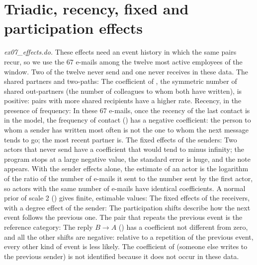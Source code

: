 \section{Triadic, recency, fixed and participation effects}\label{sec:ex-more}

\emph{ex07\_effects.do.} These effects need an event history in which the same pairs recur, so we use the 67 e-mails among the twelve most active employees of the window. Two of the twelve never send and one never receives in these data.
The shared partners and two-paths:
The coefficient of , the symmetric number of shared out-partners (the number of colleagues to whom both have written), is positive: pairs with more shared recipients have a higher rate. Recency, in the presence of frequency:
In these 67 e-mails, once the recency of the last contact is in the model, the frequency of contact () has a negative coefficient: the person to whom a sender has written most often is not the one to whom the next message tends to go; the most recent partner is. The fixed effects of the senders:
Two actors that never send have a coefficient that would tend to minus infinity; the program stops at a large negative value, the standard error is huge, and the note appears. With the sender effects alone, the estimate of an actor is the logarithm of the ratio of the number of e-mails it sent to the number sent by the first actor, so actors with the same number of e-mails have identical coefficients. A normal prior of scale 2 () gives finite, estimable values:
The fixed effects of the receivers, with a degree effect of the sender:
The participation shifts describe how the next event follows the previous one. The pair that repeats the previous event is the reference category:
The reply $B\to A$ () has a coefficient not different from zero, and all the other shifts are negative: relative to a repetition of the previous event, every other kind of event is less likely. The coefficient of  (someone else writes to the previous sender) is not identified because it does not occur in these data.
